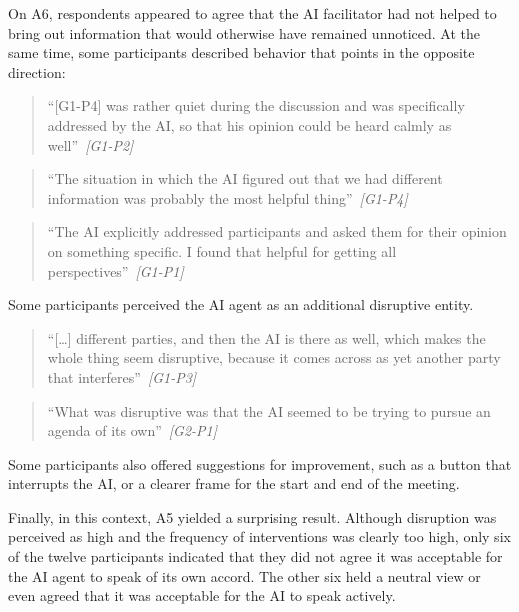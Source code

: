 On A6, respondents appeared to agree that the AI facilitator had not helped to bring out information
that would otherwise have remained unnoticed.
At the same time, some participants described behavior that points in the opposite direction:
{\setlength{\topsep}{0.25\baselineskip}\setlength{\partopsep}{0pt}%
  \begin{quote}\small
    \enquote{[G1-P4] was rather quiet during the discussion and was specifically addressed by the AI,
    so that his opinion could be heard calmly as well}~\textit{\scriptsize[G1-P2]}
\end{quote}}
{\setlength{\topsep}{0.25\baselineskip}\setlength{\partopsep}{0pt}%
  \begin{quote}\small
    \enquote{The situation in which the AI figured out that we had different information was probably
    the most helpful thing}~\textit{\scriptsize[G1-P4]}
\end{quote}}
{\setlength{\topsep}{0.25\baselineskip}\setlength{\partopsep}{0pt}%
  \begin{quote}\small
    \enquote{The AI explicitly addressed participants and asked them for their opinion on something
    specific. I found that helpful for getting all perspectives}~\textit{\scriptsize[G1-P1]}
\end{quote}}

Some participants perceived the AI agent as an additional disruptive entity.

{\setlength{\topsep}{0.25\baselineskip}\setlength{\partopsep}{0pt}%
  \begin{quote}\small
    \enquote{[\ldots] different parties, and then the AI is there as well, which makes the whole
      thing seem disruptive, because it comes across as yet another party that
    interferes}~\textit{\scriptsize[G1-P3]}
\end{quote}}

{\setlength{\topsep}{0.25\baselineskip}\setlength{\partopsep}{0pt}%
  \begin{quote}\small
    \enquote{What was disruptive was that the AI seemed to be trying to pursue an agenda of its
    own}~\textit{\scriptsize[G2-P1]}
\end{quote}}
Some participants also offered suggestions for improvement, such as a button that interrupts the AI,
or a clearer frame for the start and end of the meeting.

Finally, in this context, A5 yielded a surprising result.
Although disruption was perceived as high and the frequency of interventions was clearly too high,
only six of the twelve participants indicated that they did not agree it was acceptable for the AI agent
to speak of its own accord.
The other six held a neutral view or even agreed that it was acceptable for the AI to speak actively.

